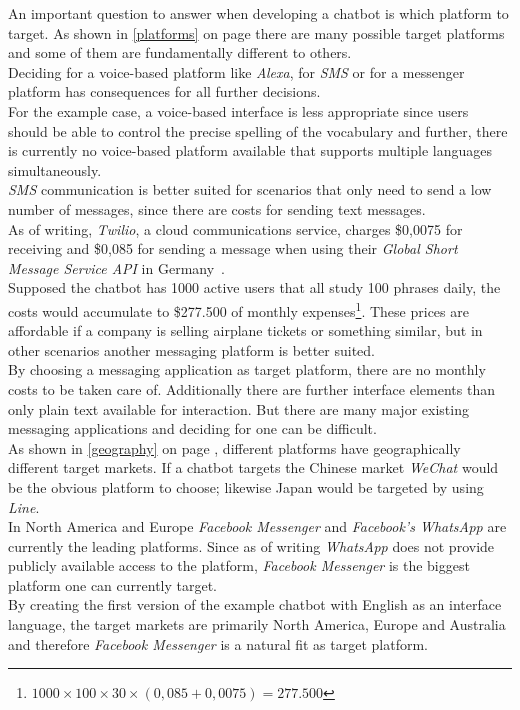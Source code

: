 An important question to answer when developing a chatbot is which platform to target.
As shown in \ref{platforms} on page \pageref{platforms} there are many possible target platforms
and some of them are fundamentally different to others.
\\

Deciding for a voice-based platform like \emph{Alexa}, for \emph{SMS} or for a messenger platform has consequences
for all further decisions.
\\
For the example case, a voice-based interface is less appropriate since
users should be able to control the precise spelling of the vocabulary
and further, there is currently no voice-based platform available
that supports multiple languages simultaneously.
\\

\emph{SMS} communication is better suited for scenarios that only need to send a low number of messages,
since there are costs for sending text messages.
\\
As of writing, \emph{Twilio}, a cloud communications service, charges \$0,0075 for receiving and \$0,085 for sending a message when using their \emph{Global Short Message Service API} in Germany~\cite{twilio}.
\\
Supposed the chatbot has 1000 active users that all study 100 phrases daily,
the costs would accumulate to \$277.500 of monthly expenses\footnote{$1000\times100\times30\times(0,085+0,0075)=277.500$}.
These prices are affordable if a company is selling airplane tickets or something similar,
but in other scenarios another messaging platform is better suited.
\\

By choosing a messaging application as target platform, there are no monthly costs to be taken care of.
Additionally there are further interface elements than only plain text available for interaction.
But there are many major existing messaging applications and deciding for one can be difficult.
\\
As shown in \ref{geography} on page \pageref{geography}, different platforms have geographically different target markets.
If a chatbot targets the Chinese market \emph{WeChat} would be the obvious platform to choose;
likewise Japan would be targeted by using\emph{ Line}.
\\
In North America and Europe \emph{Facebook Messenger} and \emph{Facebook's WhatsApp} are currently the leading platforms.
Since as of writing \emph{WhatsApp} does not provide publicly available access to the platform,
\emph{Facebook Messenger} is the biggest platform one can currently target.
\\
By creating the first version of the example chatbot with English as an interface language,
the target markets are primarily North America, Europe and Australia
and therefore \emph{Facebook Messenger} is a natural fit as target platform.
\\


